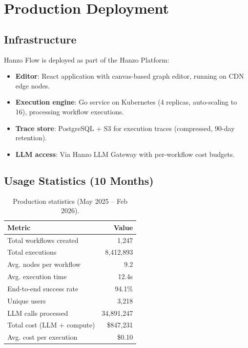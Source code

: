 \documentclass[11pt,twocolumn]{article}
\begin{document}
\section{Production Deployment}
\label{sec:production}

\subsection{Infrastructure}

Hanzo Flow is deployed as part of the Hanzo Platform:

\begin{itemize}[leftmargin=1.1em]
    \item \textbf{Editor}: React application with canvas-based graph editor, running on CDN edge nodes.
    \item \textbf{Execution engine}: Go service on Kubernetes (4 replicas, auto-scaling to 16), processing workflow executions.
    \item \textbf{Trace store}: PostgreSQL + S3 for execution traces (compressed, 90-day retention).
    \item \textbf{LLM access}: Via Hanzo LLM Gateway with per-workflow cost budgets.
\end{itemize}

\subsection{Usage Statistics (10 Months)}

\begin{table}[H]
\centering
\begin{tabular}{lr}
\toprule
\textbf{Metric} & \textbf{Value} \\
\midrule
Total workflows created & 1,247 \\
Total executions & 8,412,893 \\
Avg. nodes per workflow & 9.2 \\
Avg. execution time & 12.4s \\
End-to-end success rate & 94.1\% \\
Unique users & 3,218 \\
LLM calls processed & 34,891,247 \\
Total cost (LLM + compute) & \$847,231 \\
Avg. cost per execution & \$0.10 \\
\bottomrule
\end{tabular}
\caption{Production statistics (May 2025 -- Feb 2026).}
\label{tab:prod_stats}
\end{table}
\end{document}
